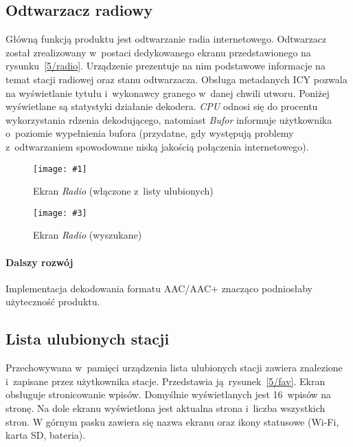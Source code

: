 \documentclass[polish]{aghengthesis}
\newcommand{\imgintss}[5]{
	\begin{figure}[{#5}]
		\centering
		\begin{minipage}{.45\textwidth}
			\centering
			\texttt{[image: \#1]}
			\caption{#2}
			\label{#1}
		\end{minipage}%
		\hfill
		\begin{minipage}{.45\textwidth}
			\centering
			\texttt{[image: \#3]}
			\caption{#4}
			\label{#3}
		\end{minipage}
	\end{figure}
}
\newcommand{\imghss}[4]{\imgintss{#1}{#2}{#3}{#4}{H}}
\begin{document}
		\subsection{Odtwarzacz radiowy}			
			Główną funkcją produktu jest odtwarzanie radia internetowego. Odtwarzacz został zrealizowany w~postaci dedykowanego ekranu przedstawionego na rysunku~\ref{5/radio}. Urządzenie prezentuje na nim podstawowe informacje na temat stacji radiowej oraz stanu odtwarzacza. Obsługa metadanych ICY pozwala na wyświetlanie tytułu i~wykonawcy granego w~danej chwili utworu. Poniżej wyświetlane są statystyki działanie dekodera. \textit{CPU} odnosi się do procentu wykorzystania rdzenia dekodującego, natomiast \textit{Bufor} informuje użytkownika o~poziomie wypełnienia bufora (przydatne, gdy występują problemy z~odtwarzaniem spowodowane niską jakością połączenia internetowego).
			
			\imghss{5/radio}{Ekran \textit{Radio} (włączone z~listy ulubionych)}{5/radio_search}{Ekran \textit{Radio} (wyszukane)}
			
		
			\paragraph{Dalszy rozwój}
				Implementacja dekodowania formatu AAC/AAC+ znacząco podniosłaby użyteczność produktu.
			
		\subsection{Lista ulubionych stacji}
			Przechowywana w~pamięci urządzenia lista ulubionych stacji zawiera znalezione i~zapisane przez użytkownika stacje. Przedstawia ją rysunek~\ref{5/fav}.
			Ekran obsługuje stronicowanie wpisów. Domyślnie wyświetlanych jest 16~wpisów na stronę. Na dole ekranu wyświetlona jest aktualna strona i~liczba wszystkich stron.
			W górnym pasku zawiera się nazwa ekranu oraz ikony statusowe (Wi-Fi, karta SD, bateria).
			
\end{document}
